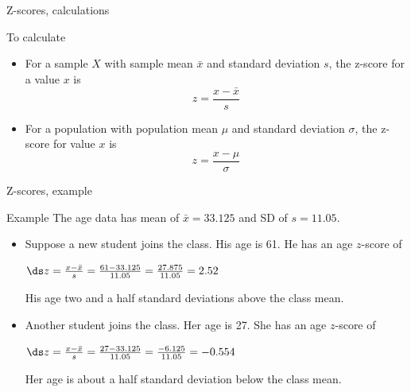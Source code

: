 \documentclass[xcolor=table, handout]{beamer}
\begin{document}
\begin{frame}{Z-scores, calculations}
\begin{block}{To calculate}
\begin{itemize}
\item For a sample $X$ with sample mean $\bar x$ and standard deviation $s$, the z-score for a value $x$ is
\[z = \frac{x - \bar x}{s}\]
\smallskip
\pause
\item For a population with population mean $\mu$ and standard deviation $\sigma$, the z-score for value $x$ is
\[z = \frac{x - \mu}{\sigma}\]
\end{itemize} 
\end{block}
\end{frame}

\begin{frame}{Z-scores, example}
\begin{exampleblock}{Example}
The age data has mean of $\bar x = 33.125$ and SD of $s=11.05$.
\begin{itemize}
\pause
\item Suppose a new student joins the class. His age is 61. He has an age $z$-score of\\
\smallskip
{\centering
$\ds z = \frac{x - \bar x}{s} = \frac {61-33.125}{11.05} = \frac {27.875}{11.05} = 2.52$
\par}
\medskip
\pause
His age two and a half standard deviations above the class mean.
\smallskip
\pause
\item Another student joins the class. Her age is 27. She has an age $z$-score of\\
\smallskip
{\centering
$\ds z = \frac{x - \bar x}{s} = \frac {27-33.125}{11.05} = \frac {-6.125}{11.05} = -0.554$
\par}
\medskip
\pause
Her age is about a half standard deviation below the class mean.
\end{itemize}

\end{exampleblock}
\end{frame}
\end{document}
